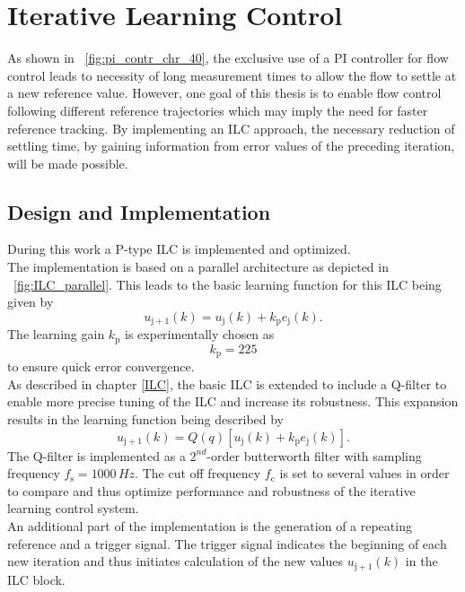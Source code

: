 \section{Iterative Learning Control}\label{ILC_1}
As shown in \figurename~\ref{fig:pi_contr_chr_40}, the exclusive use of a PI controller for flow control leads to necessity of long measurement times to allow the flow to settle at a new reference value. However, one goal of this thesis is to enable flow control following different reference trajectories which may imply the need for faster reference tracking. By implementing an ILC approach, the necessary reduction of settling time, by gaining information from error values of the preceding iteration, will be made possible.
\subsection{Design and Implementation}
During this work a P-type ILC is implemented and optimized.
\\The implementation is based on a parallel architecture as depicted in \figurename~\ref{fig:ILC_parallel}. This leads to the basic learning function for this ILC being given by
\begin{equation}
  u_{\mathrm{j+1}}(k) = u_{\mathrm{j}}(k)+k_{\mathrm{p}}e_{\mathrm{j}}(k).
\end{equation}
The learning gain $k_{\mathrm{p}}$ is experimentally chosen as
\begin{equation}
  k_{\mathrm{p}} = 225
\end{equation}
to ensure quick error convergence.
\\As described in chapter \ref{ILC}, the basic ILC is extended to include a Q-filter to enable more precise tuning of the ILC and increase its robustness.
This expansion results in the learning function being described by
\begin{equation}
  u_{\mathrm{j+1}}(k) = Q(q)[u_{\mathrm{j}}(k)+k_{\mathrm{p}}e_{\mathrm{j}}(k)].
\end{equation}
The Q-filter is implemented as a $2^{nd}$-order butterworth filter with sampling frequency $f_{\mathrm{s}}=1000\,Hz$. The cut off frequency $f_{\mathrm{c}}$ is set to several values in order to compare and thus optimize performance and robustness of the iterative learning control system.
\\An additional part of the implementation is the generation of a repeating reference and a trigger signal. The trigger signal indicates the beginning of each new iteration and thus initiates calculation of the new values $u_{\mathrm{j+1}}(k)$ in the ILC block.
